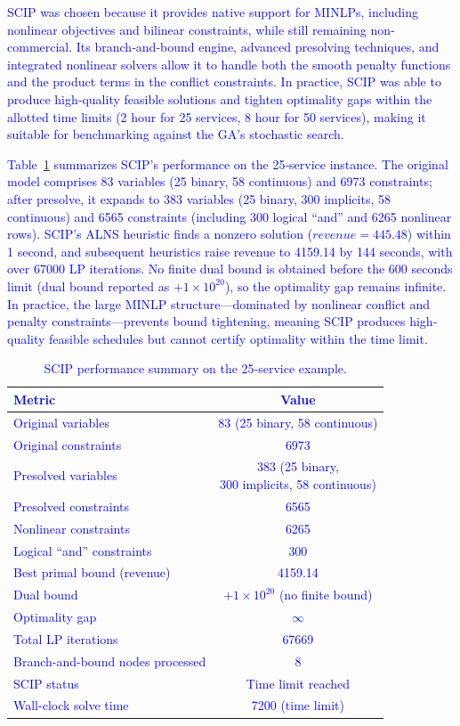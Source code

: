 \documentclass[Afour,sagev,times]{sagej}
\newcommand{\primero}[1]{\textcolor{blue}{#1}}
\begin{document}
\primero{
SCIP was chosen because it provides native support for MINLPs, including nonlinear objectives and bilinear constraints, while still remaining non‐commercial. Its branch‐and‐bound engine, advanced presolving techniques, and integrated nonlinear solvers allow it to handle both the smooth penalty functions and the product terms in the conflict constraints. In practice, SCIP was able to produce high‐quality feasible solutions and tighten optimality gaps within the allotted time limits (2 hour for 25 services, 8 hour for 50 services), making it suitable for benchmarking against the GA’s stochastic search.  
}

\primero{
Table~\ref{tab:scip_25_summary} summarizes SCIP’s performance on the 25‐service instance. The original model comprises 83 variables (25 binary, 58 continuous) and 6973 constraints; after presolve, it expands to 383 variables (25 binary, 300 implicits, 58 continuous) and 6565 constraints (including 300 logical ``and'' and 6265 nonlinear rows). SCIP’s ALNS heuristic finds a nonzero solution ($ revenue = 445.48 $) within 1 second, and subsequent heuristics raise revenue to 4159.14 by 144 seconds, with over 67000 LP iterations. No finite dual bound is obtained before the 600 seconds limit (dual bound reported as \(+1\times10^{20}\)), so the optimality gap remains infinite. In practice, the large MINLP structure—dominated by nonlinear conflict and penalty constraints—prevents bound tightening, meaning SCIP produces high‐quality feasible schedules but cannot certify optimality within the time limit.   
}

\begin{table}[htbp]
\centering
\scriptsize
\caption{SCIP performance summary on the 25‐service example.}
\primero{
\begin{tabular}{|p{}|c|}
\hline
\textbf{Metric} & \textbf{Value} \\ \hline
Original variables & 83 (25 binary, 58 continuous) \\ 
Original constraints & 6973 \\ \hline
Presolved variables & \makecell{383 (25 binary, \\ 300 implicits, 58 continuous)} \\ 
Presolved constraints & 6565 \\ 
  Nonlinear constraints & 6265 \\ 
  Logical “and” constraints & 300 \\ \hline
Best primal bound (revenue) & 4159.14 \\ 
Dual bound & \(+1\times10^{20}\) (no finite bound) \\ 
Optimality gap & \(\infty\) \\ \hline
Total LP iterations & 67669 \\ 
Branch-and-bound nodes processed & 8 \\ 
SCIP status & Time limit reached \\ 
Wall-clock solve time & 7200 (time limit) \\ \hline
\end{tabular}
}
\label{tab:scip_25_summary}
\end{table}
\end{document}
